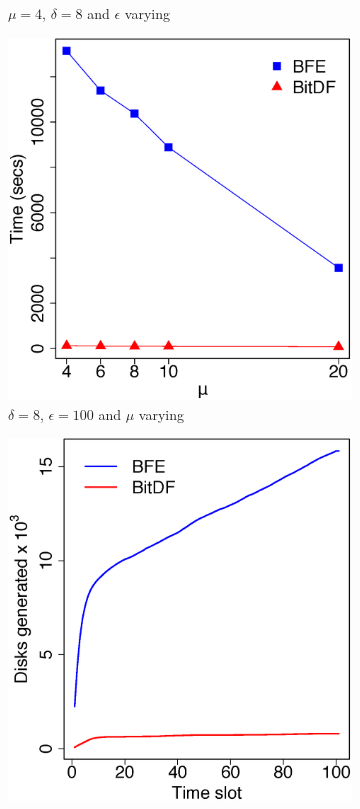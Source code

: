 \begin{figure}
\begin{subfigure}[t]{0.25\textwidth}
        \caption{$\mu = 4$, $\delta = 8$ and $\epsilon$ varying}
        \label{fig:brinkhoff_vary_g}
    \end{subfigure}
    \begin{subfigure}[t]{0.25\textwidth}
        \includegraphics[width=\textwidth]{images/Brinkhoff_l_8_g_200_varying_n.eps}
        \caption{$\delta = 8$, $\epsilon = 100$ and $\mu$ varying}
        \label{fig:brinkhoff_vary_n}
    \end{subfigure}
    \begin{subfigure}[t]{0.25\textwidth}
        \includegraphics[width=\textwidth]{images/Brinkhoff_d.eps}

\end{subfigure}
\end{figure}
